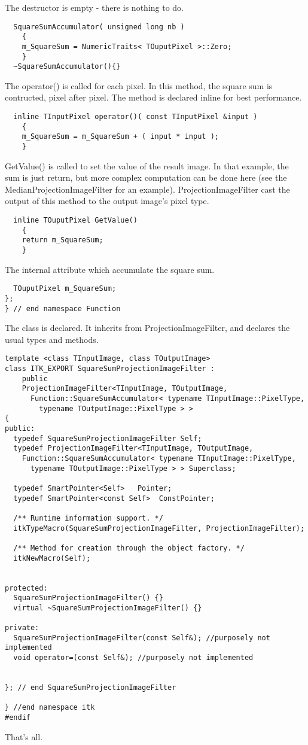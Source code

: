 \documentclass{InsightArticle}
\begin{document}
The destructor is empty - there is nothing to do.
\small \begin{verbatim}
  SquareSumAccumulator( unsigned long nb )
    {
    m_SquareSum = NumericTraits< TOuputPixel >::Zero;
    }
  ~SquareSumAccumulator(){}
\end{verbatim} \normalsize
The operator() is called for each pixel. In this method, the square sum is
contructed, pixel after pixel. The method is declared inline for best
performance.
\small \begin{verbatim}
  inline TInputPixel operator()( const TInputPixel &input )
    {
    m_SquareSum = m_SquareSum + ( input * input );
    }
\end{verbatim} \normalsize
GetValue() is called to set the value of the result image. In that example, the
sum is just return, but more complex computation can be done here (see the
MedianProjectionImageFilter for an example). ProjectionImageFilter cast the
output of this method to the output image's pixel type.
\small \begin{verbatim}
  inline TOuputPixel GetValue()
    {
    return m_SquareSum;
    }
\end{verbatim} \normalsize
The internal attribute which accumulate the square sum.
\small \begin{verbatim}
  TOuputPixel m_SquareSum;
};
} // end namespace Function
\end{verbatim} \normalsize
The class is declared. It inherits from ProjectionImageFilter, and declares the
usual types and methods.
\small \begin{verbatim}
template <class TInputImage, class TOutputImage>
class ITK_EXPORT SquareSumProjectionImageFilter :
    public
    ProjectionImageFilter<TInputImage, TOutputImage,
      Function::SquareSumAccumulator< typename TInputImage::PixelType,
        typename TOutputImage::PixelType > >
{
public:
  typedef SquareSumProjectionImageFilter Self;
  typedef ProjectionImageFilter<TInputImage, TOutputImage, 
    Function::SquareSumAccumulator< typename TInputImage::PixelType,
      typename TOutputImage::PixelType > > Superclass;

  typedef SmartPointer<Self>   Pointer;
  typedef SmartPointer<const Self>  ConstPointer;

  /** Runtime information support. */
  itkTypeMacro(SquareSumProjectionImageFilter, ProjectionImageFilter);

  /** Method for creation through the object factory. */
  itkNewMacro(Self);


protected:
  SquareSumProjectionImageFilter() {}
  virtual ~SquareSumProjectionImageFilter() {}

private:
  SquareSumProjectionImageFilter(const Self&); //purposely not implemented
  void operator=(const Self&); //purposely not implemented


}; // end SquareSumProjectionImageFilter

} //end namespace itk
#endif
\end{verbatim} \normalsize
That's all.
\end{document}
